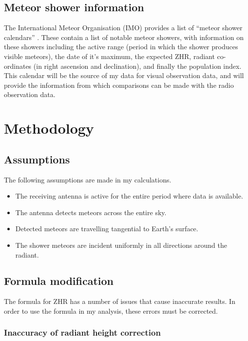 \subsection{Meteor shower information}
The International Meteor Organisation (IMO) provides a list of ``meteor shower calendars'' \cite{imo_meteor_calendar}. These contain a list of notable meteor showers, with information on these showers including the active range (period in which the shower produces visible meteors), the date of it's maximum, the expected ZHR, radiant co-ordinates (in right ascension and declination), and finally the population index. This calendar will be the source of my data for visual observation data, and will provide the information from which comparisons can be made with the radio observation data.
\section{Methodology}
\subsection{Assumptions}
The following assumptions are made in my calculations.
\begin{itemize}
	\item The receiving antenna is active for the entire period where data is available.
	\item The antenna detects meteors across the entire sky.
	\item Detected meteors are travelling tangential to Earth's surface.
	\item The shower meteors are incident uniformly in all directions around the radiant.
\end{itemize}
\subsection{Formula modification}
The formula \cite{zhr} for ZHR has a number of issues that cause inaccurate results. In order to use the formula in my analysis, these errors must be corrected.
\subsubsection{Inaccuracy of radiant height correction}
